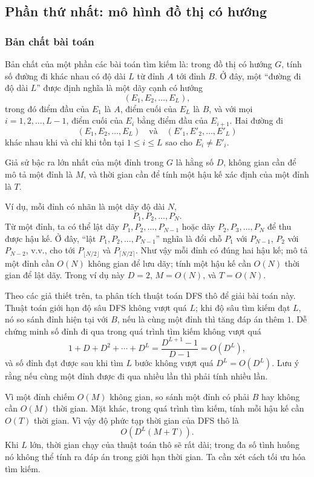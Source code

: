 \documentclass[11pt]{article}
\begin{document}
\subsection{Phần thứ nhất: mô hình đồ thị có hướng}

\subsubsection{Bản chất bài toán}

Bản chất của một phần các bài toán tìm kiếm là: trong đồ thị có hướng \(G\),
tính số đường đi khác nhau có độ dài \(L\) từ đỉnh \(A\) tới đỉnh \(B\). Ở
đây, một ``đường đi độ dài \(L\)'' được định nghĩa là một dãy cạnh có hướng
\[
  (E_1,E_2,\ldots,E_L),
\]
trong đó điểm đầu của \(E_1\) là \(A\), điểm cuối của \(E_L\) là \(B\), và
với mọi \(i=1,2,\ldots,L-1\), điểm cuối của \(E_i\) bằng điểm đầu của
\(E_{i+1}\). Hai đường đi
\[
  (E_1,E_2,\ldots,E_L)
  \quad\text{và}\quad
  (E'_1,E'_2,\ldots,E'_L)
\]
khác nhau khi và chỉ khi tồn tại \(1\le i\le L\) sao cho \(E_i\ne E'_i\).

Giả sử bậc ra lớn nhất của một đỉnh trong \(G\) là hằng số \(D\), không gian
cần để mô tả một đỉnh là \(M\), và thời gian cần để tính một hậu kế xác định
của một đỉnh là \(T\).

Ví dụ, mỗi đỉnh có nhãn là một dãy độ dài \(N\),
\[
  P_1,P_2,\ldots,P_N.
\]
Từ một đỉnh, ta có thể lật dãy \(P_1,P_2,\ldots,P_{N-1}\) hoặc dãy
\(P_2,P_3,\ldots,P_N\) để thu được hậu kế. Ở đây, ``lật
\(P_1,P_2,\ldots,P_{N-1}\)'' nghĩa là đổi chỗ \(P_1\) với \(P_{N-1}\),
\(P_2\) với \(P_{N-2}\), v.v., cho tới \(P_{\lfloor N/2\rfloor}\) và
\(P_{\lceil N/2\rceil}\). Như vậy mỗi đỉnh có đúng hai hậu kế; mô tả một
đỉnh cần \(O(N)\) không gian để lưu dãy; tính một hậu kế cần \(O(N)\) thời
gian để lật dãy. Trong ví dụ này \(D=2\), \(M=O(N)\), và \(T=O(N)\).

Theo các giả thiết trên, ta phân tích thuật toán DFS thô để giải bài toán
này. Thuật toán giới hạn độ sâu DFS không vượt quá \(L\); khi độ sâu tìm kiếm
đạt \(L\), nó so sánh đỉnh hiện tại với \(B\), nếu là cùng một đỉnh thì tăng
đáp án thêm \(1\). Dễ chứng minh số đỉnh đi qua trong quá trình tìm kiếm
không vượt quá
\[
  1+D+D^2+\cdots+D^L=\frac{D^{L+1}-1}{D-1}=O(D^L),
\]
và số đỉnh đạt được sau khi tìm \(L\) bước không vượt quá \(D^L=O(D^L)\). Lưu
ý rằng nếu cùng một đỉnh được đi qua nhiều lần thì phải tính nhiều lần.

Vì một đỉnh chiếm \(O(M)\) không gian, so sánh một đỉnh có phải \(B\) hay
không cần \(O(M)\) thời gian. Mặt khác, trong quá trình tìm kiếm, tính mỗi
hậu kế cần \(O(T)\) thời gian. Vì vậy độ phức tạp thời gian của DFS thô là
\[
  O(D^L(M+T)).
\]
Khi \(L\) lớn, thời gian chạy của thuật toán thô sẽ rất dài; trong đa số tình
huống nó không thể tính ra đáp án trong giới hạn thời gian. Ta cần xét cách
tối ưu hóa tìm kiếm.
\end{document}
